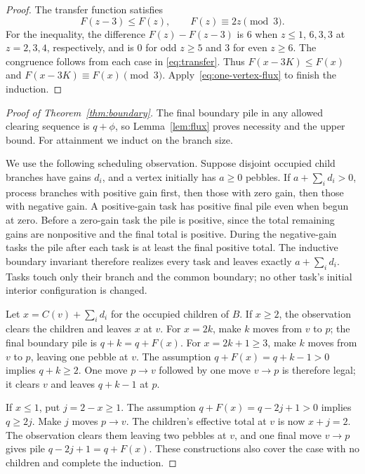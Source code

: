 \begin{proof}
The transfer function satisfies
\begin{equation}\label{eq:three-loss}
 F(z-3)\le F(z),\qquad F(z)\equiv2z\pmod3.
\end{equation}
For the inequality, the difference $F(z)-F(z-3)$ is $6$ when $z\le1$,
$6,3,3$ at $z=2,3,4$, respectively, and is $0$ for odd $z\ge5$ and
$3$ for even $z\ge6$. The congruence follows from each case in
\eqref{eq:transfer}. Thus $F(x-3K)\le F(x)$ and
$F(x-3K)\equiv F(x)\pmod3$. Apply~\eqref{eq:one-vertex-flux}
to finish the induction.
\end{proof}

\begin{proof}[Proof of Theorem~\ref{thm:boundary}]
The final boundary pile in any allowed clearing sequence is $q+\phi$,
so Lemma~\ref{lem:flux} proves necessity and the upper bound.
For attainment we induct on the branch size.

We use the following scheduling observation. Suppose disjoint occupied
child branches have gains $d_i$, and a vertex initially has $a\ge0$
pebbles. If $a+\sum_i d_i>0$, process branches with positive gain first,
then those with zero gain, then those with negative gain. A positive-gain
task has positive final pile even when begun at zero. Before a zero-gain
task the pile is positive, since the total remaining gains are nonpositive
and the final total is positive. During the negative-gain tasks the pile
after each task is at least the final positive total. The inductive
boundary invariant therefore realizes every task and leaves exactly
$a+\sum_i d_i$. Tasks touch only their branch and the common boundary;
no other task's initial interior configuration is changed.

Let $x=C(v)+\sum_i d_i$ for the occupied children of $B$.
If $x\ge2$, the observation clears the children and leaves $x$ at $v$.
For $x=2k$, make $k$ moves from $v$ to $p$; the final boundary pile is
$q+k=q+F(x)$.
For $x=2k+1\ge3$, make $k$ moves from $v$ to $p$, leaving one pebble
at $v$. The assumption $q+F(x)=q+k-1>0$ implies $q+k\ge2$.
One move $p\to v$ followed by one move $v\to p$ is therefore legal;
it clears $v$ and leaves $q+k-1$ at $p$.

If $x\le1$, put $j=2-x\ge1$. The assumption
$q+F(x)=q-2j+1>0$ implies $q\ge2j$. Make $j$ moves $p\to v$.
The children's effective total at $v$ is now $x+j=2$.
The observation clears them leaving two pebbles at $v$, and one final
move $v\to p$ gives pile $q-2j+1=q+F(x)$.
These constructions also cover the case with no children and complete
the induction.
\end{proof}

